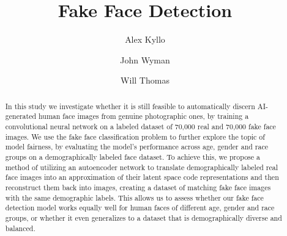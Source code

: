 \documentclass[11pt, letterpaper]{article}
\title{Fake Face Detection}
\author{
  Alex Kyllo
  \and
  John Wyman
  \and
  Will Thomas
}
\begin{document}
\maketitle

\begin{abstract}
  In this study we investigate whether it is still feasible to automatically
  discern AI-generated human face images from genuine photographic ones, by
  training a convolutional neural network on a labeled dataset of 70,000 real
  and 70,000 fake face images. We use the fake face classification problem to
  further explore the topic of model fairness, by evaluating the model's
  performance across age, gender and race groups on a demographically labeled
  face dataset. To achieve this, we propose a method of utilizing an autoencoder
  network to translate demographically labeled real face images into an
  approximation of their latent space code representations and then reconstruct
  them back into images, creating a dataset of matching fake face images with
  the same demographic labels. This allows us to assess whether our fake face
  detection model works equally well for human faces of different age, gender
  and race groups, or whether it even generalizes to a dataset that is
  demographically diverse and balanced.
\end{abstract}
\end{document}
